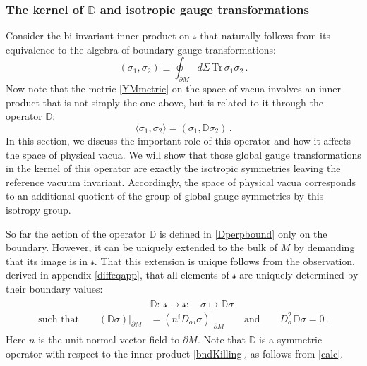 \documentclass[11pt,a4paper]{article}
\def\calsg{{\boldsymbol{\mathscr g}}}
\def\calss{{\boldsymbol{\mathscr s}}}
\def\Tr{\mathrm{Tr}}
\def\Dperp{{\mathbb{D}}}
\begin{document}
    \subsubsection{The kernel of $\Dperp$ and isotropic gauge transformations}
    Consider the bi-invariant inner product on $\calss$ that naturally follows from its equivalence to the algebra of boundary gauge transformations:
    \begin{equation}
    (\sigma_1,\sigma_2)\equiv\oint_{\partial M}\! d\Sigma \,\Tr\, \sigma_1\sigma_2\label{bndKilling}\,.
    \end{equation}
    Now note that the metric \eqref{YMmetric} on the space of vacua involves an inner product that is not simply the one above, but is related to it through the operator $\Dperp$:
    \begin{equation}
    \langle\sigma_1,\sigma_2\rangle=(\sigma_1,\Dperp \sigma_2)\label{innerproducts}\,.
    \end{equation} 
    In this section, we discuss the important role of this operator and how it affects the space of physical vacua. %
    We will show that those global gauge transformations in the kernel of this operator are exactly the isotropic symmetries leaving the reference vacuum invariant. Accordingly, the space of physical vacua corresponds to an additional quotient of the group of global gauge symmetries by this isotropy group.
    
    
    So far the action of the operator $\Dperp$  is defined in \eqref{Dperpbound} only on the boundary. However, it can be uniquely extended to the bulk of $M$ by demanding that its image is in $\calss$. That this extension is unique follows from the observation, derived in appendix \ref{diffeqapp}, that all elements of $\calss$ are uniquely determined by their boundary values:
    \begin{align}
    \begin{split}
        &\Dperp:\ \calss\to \calss:\quad \sigma\mapsto \Dperp\sigma\\
\mbox{such that}    \qquad \left.(\Dperp\sigma)\right|_{\partial M}&=\left.(n^i D_{o\,i}\sigma)\right|_{\partial M}\qquad\mbox{and}\qquad D^2_o\, \Dperp\sigma=0\label{Dperpdef}\,.
    \end{split}
    \end{align}
    Here $n$ is the unit normal vector field to $\partial M$. Note that $\Dperp$ is a symmetric operator with respect to the inner product \eqref{bndKilling}, as follows from \eqref{calc}.
    
\end{document}
